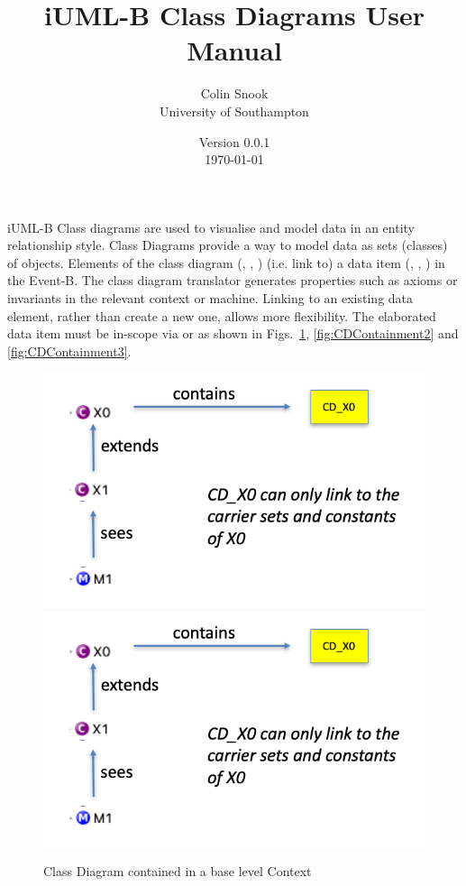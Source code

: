 \documentclass[a4paper,10pt]{article}
\title{iUML-B Class Diagrams User Manual}
\author{Colin Snook\\University of Southampton}
\date{%
	Version 0.0.1\\%
	\today%
}
\begin{document}
	\ifplastex%
	\maketitle%
	\else%
	\ifstandalone%
	\maketitle %
	\else%
	\fi%
	\fi%
	
iUML-B Class diagrams are used to visualise and model data in an entity relationship style.
Class Diagrams provide a way to model data as sets (classes) of objects.
Elements of the class diagram (, , )  (i.e. link to) a data item (, , ) in the Event-B.
The class diagram translator generates properties such as axioms or invariants in the relevant context or machine.
Linking to an existing data element, rather than create a new one, allows more flexibility.
The elaborated data item must be in-scope via  or  as shown in Figs.~\ref{fig:CDContainment1}, \ref{fig:CDContainment2} and 	\ref{fig:CDContainment3}.
	
	\begin{figure}[!htbp]
		\centering
		\ifplastex
		\includegraphics[width=500]{figures/containment_1.png}
		\else
		\includegraphics[width=.5\textwidth]{figures/containment_1.png}
		\fi
		\caption{Class Diagram contained in a base level Context}
		\label{fig:CDContainment1}
	\end{figure}
	
\end{document}
